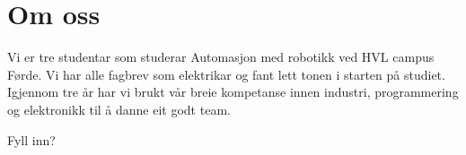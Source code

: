 
\thispagestyle{fancy}

\section{Om oss}

Vi er tre studentar som studerar Automasjon med robotikk ved HVL campus Førde.
Vi har alle fagbrev som elektrikar og fant lett tonen i starten på studiet.
Igjennom tre år har vi brukt vår breie kompetanse innen industri, programmering og elektronikk
til å danne eit godt team.

Fyll inn?


